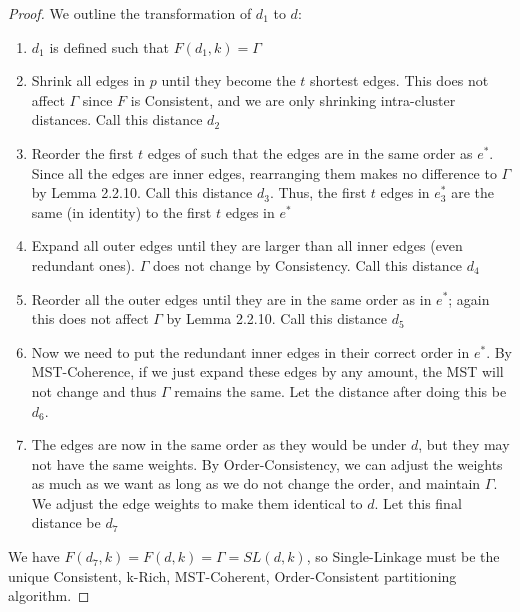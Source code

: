 \begin{proof}
    We outline the transformation of $d_1$ to $d$:
    \begin{enumerate}
        \item $d_1$ is defined such that $F(d_1,k) = \Gamma$
        \item Shrink all edges in $p$ until they become the $t$ shortest edges. This does not affect $\Gamma$ since $F$ is Consistent, and we are only shrinking intra-cluster distances. Call this distance $d_2$
        \item Reorder the first $t$ edges of such that the edges are in the same order as $e^*$. Since all the edges are inner edges, rearranging them makes no difference to $\Gamma$ by Lemma 2.2.10. Call this distance $d_3$. Thus, the first $t$ edges in $e^*_3$ are the same (in identity) to the first $t$ edges in $e^*$
        \item Expand all outer edges until they are larger than all inner edges (even redundant ones). $\Gamma$ does not change by Consistency. Call this distance $d_4$
        \item Reorder all the outer edges until they are in the same order as in $e^*$; again this does not affect $\Gamma$ by Lemma 2.2.10. Call this distance $d_5$
        \item Now we need to put the redundant inner edges in their correct order in $e^*$. By MST-Coherence, if we just expand these edges by any amount, the MST will not change and thus $\Gamma$ remains the same. Let the distance after doing this be $d_6$.
        \item The edges are now in the same order as they would be under $d$, but they may not have the same weights. By Order-Consistency, we can adjust the weights as much as we want as long as we do not change the order, and maintain $\Gamma$. We adjust the edge weights to make them identical to $d$. Let this final distance be $d_7$
    \end{enumerate}
    
    We have $F(d_7,k) = F(d,k) = \Gamma = SL(d, k)$, so Single-Linkage must be the unique Consistent, k-Rich, MST-Coherent, Order-Consistent partitioning algorithm.
\end{proof}